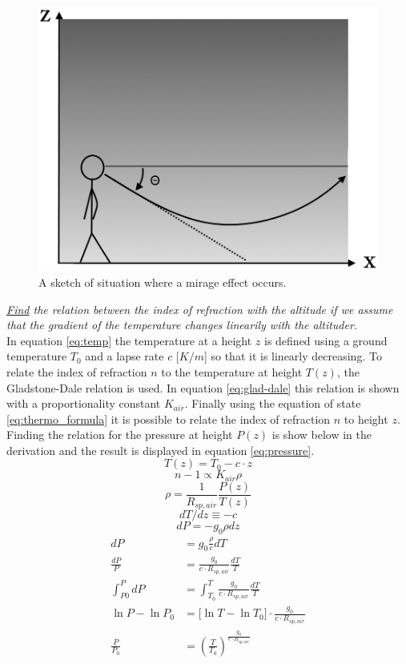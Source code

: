 \documentclass{article}
\begin{document}
\begin{figure}[h!]
	\centering
	\includegraphics[width=0.4\linewidth,keepaspectratio]{afbeeldingen/miraaj.png}
	\caption{A sketch of situation where a mirage effect occurs.}
	\label{fig:mirage}
\end{figure}


\textit{\underline{Find} the relation between the index of refraction with the altitude if we assume that the gradient of the temperature changes linearily with the altituder.}\\
In equation \ref{eq:temp} the temperature at a height $z$ is defined using a ground temperature $T_0$ and a lapse rate $c$ [$K /m$] so that it is linearly decreasing. To relate the index of refraction $n$ to the temperature at height $T(z)$, the Gladstone-Dale relation is used. In equation \ref{eq:glad-dale} this relation is shown with a proportionality constant $K_{air}$. Finally using the equation of state \ref{eq:thermo_formula} it is possible to relate the index of refraction $n$ to height $z$. Finding the relation for the pressure at height $P(z)$ is show below in the derivation and the result is displayed in equation \ref{eq:pressure}.\\
\begin{equation}
	T(z) = T_0 - c \cdot z
	\label{eq:temp}
\end{equation}
\begin{equation}
	n-1 \propto K_{air} \rho
	\label{eq:glad-dale}
\end{equation}
\begin{equation}
	\rho = \frac{1}{R_{sp,air}} \frac{P(z)}{T(z)}
	\label{eq:thermo_formula}
\end{equation}
\begin{equation*}
	dT/dz \equiv -c
\end{equation*}
\begin{equation*}
	dP = -g_0 \rho dz
\end{equation*}
\begin{align*}
	dP &= g_0 \frac{\rho}{c} dT\\
	\frac{dP}{P} &= \frac{g_0}{c\cdot R_{sp,air}}\frac{dT}{T}\\
	\int_{P0}^P dP &= \int_{T_0}^T \frac{g_0}{c\cdot R_{sp,air}}\frac{dT}{T}\\
	\ln{P}-\ln{P_0} &= \big[\ln{T} - \ln{T_0}\big] \cdot \frac{g_0}{c\cdot R_{sp,air}}\\
	\frac{P}{P_0} &= (\frac{T}{T_0})^{\frac{g_0}{c\cdot R_{sp,air}}}
\end{align*}
\end{document}
